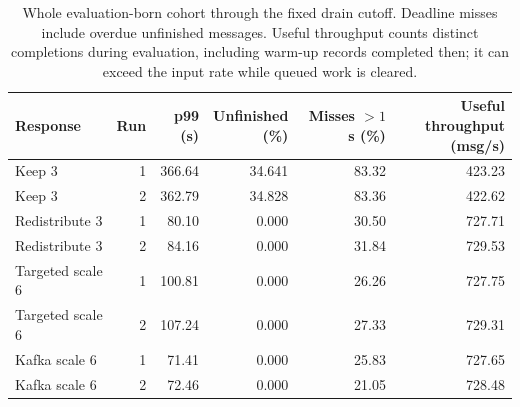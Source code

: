 \begin{table}[!htbp]
\centering\small
\setlength{\tabcolsep}{3pt}
\renewcommand{\arraystretch}{1.12}
\begin{tabular}{@{}lrrrrr@{}}
\toprule
Response & Run & \shortstack{p99\\(s)} & \shortstack{Unfinished\\(\%)} & \shortstack{Misses $>1$ s\\(\%)} & \shortstack{Useful throughput\\(msg/s)}\\
\midrule
Keep 3 & 1 & 366.64 & 34.641 & 83.32 & 423.23\\
Keep 3 & 2 & 362.79 & 34.828 & 83.36 & 422.62\\
Redistribute 3 & 1 & 80.10 & 0.000 & 30.50 & 727.71\\
Redistribute 3 & 2 & 84.16 & 0.000 & 31.84 & 729.53\\
Targeted scale 6 & 1 & 100.81 & 0.000 & 26.26 & 727.75\\
Targeted scale 6 & 2 & 107.24 & 0.000 & 27.33 & 729.31\\
Kafka scale 6 & 1 & 71.41 & 0.000 & 25.83 & 727.65\\
Kafka scale 6 & 2 & 72.46 & 0.000 & 21.05 & 728.48\\
\bottomrule
\end{tabular}
\caption{Whole evaluation-born cohort through the fixed drain cutoff. Deadline misses include overdue unfinished messages. Useful throughput counts distinct completions during evaluation, including warm-up records completed then; it can exceed the input rate while queued work is cleared.}
\label{tab:twelve-partition-outcomes}
\end{table}
